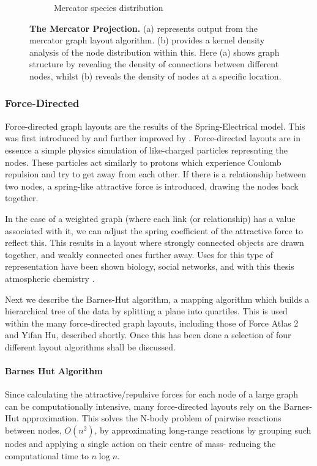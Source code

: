 \begin{figure}[H]
\begin{subfigure}[b]{.495\textwidth}
     \caption{Mercator species distribution}
     \end{subfigure}
        \caption{\textbf{The Mercator Projection.} (a) represents output from the mercator graph layout algorithm. (b) provides a kernel density analysis of the node distribution within this. Here (a) shows graph structure by revealing the density of connections between different nodes, whilst (b) reveals the density of nodes at a specific location. }
        \label{fig:merc}
\end{figure}

\subsubsection{Force-Directed}\label{sec:forcedirected}

Force-directed graph layouts are the results of the Spring-Electrical model. This was first introduced by \citep{Eades} and further improved by \citep{raingold}. Force-directed layouts are in essence a simple physics simulation of like-charged particles represnting the nodes. These particles act similarly to protons which experience Coulomb repulsion and try to get away from each other. If there is a relationship between two nodes, a spring-like attractive force is introduced, drawing the nodes back together. 

In the case of a weighted graph (where each link (or relationship) has a value associated with it, we can adjust the spring coefficient of the attractive force to reflect this. This results in a layout where strongly connected objects are drawn together, and weakly connected ones further away. Uses for this type of representation have been shown biology, social networks, and with this thesis atmospheric chemistry \citep{ch3,ch4}.

Next we describe the Barnes-Hut algorithm, a mapping algorithm which builds a hierarchical tree of the data by splitting a plane into quartiles. This is used within the many force-directed graph layouts, including those of Force Atlas 2 and Yifan Hu, described shortly. Once this has been done a selection of four different layout algorithms shall be discussed.  


\paragraph*{Barnes Hut Algorithm}
Since calculating the attractive/repulsive forces for each node of a large graph can be computationally intensive, many force-directed layouts rely on the Barnes-Hut approximation. This solves the N-body problem of pairwise reactions between nodes, $O(n^2)$, by approximating long-range reactions by grouping such nodes and applying a single action on their centre of mass- reducing the computational time to $n \log n$.  

